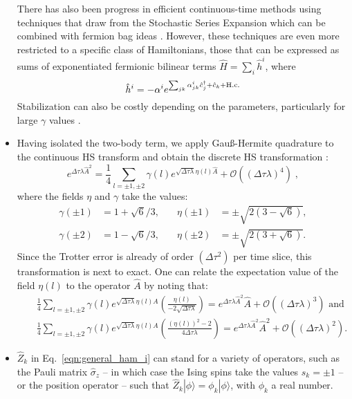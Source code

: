 \begin{itemize}
There has also been progress in efficient continuous-time methods using techniques that draw from the Stochastic Series Expansion \cite{Wang16} which can be combined with fermion bag ideas \cite{Huffman17}. However, these techniques are even more restricted to a specific class of Hamiltonians, those that can be expressed as sums of exponentiated fermionic bilinear terms $\hat{H} = \sum_i \hat{h}^i$, where
\begin{equation}
\hat{h}^i = -\alpha^i e^{\sum_{jk} \alpha^i_{jk} \hat{c}^\dagger_j + \hat{c}_k + \mathrm{H.c.} }
\end{equation}
Stabilization can also be costly depending on the parameters, particularly for large $\gamma$ values \cite{huffman2019}.
\item  Having isolated the two-body term, we apply Gau\ss{}-Hermite quadrature \cite{goth2020} to the 
continuous HS transform and obtain the discrete HS transformation \cite{Motome97,Assaad97}:
\begin{equation}
\label{HS_squares}
        e^{\Delta \tau  \lambda  \hat{A}^2 } = \frac{1}{4}
        \sum_{ l = \pm 1, \pm 2}  \gamma(l)
e^{ \sqrt{\Delta \tau \lambda }
       \eta(l)  \hat{A} }
                + \mathcal{O} \left(  (\Delta \tau \lambda)^4\right) \;,
\end{equation}
where the fields $\eta$ and $\gamma$ take the values:
\begin{equation} \label{eta_gamma_fields}
\begin{aligned}
\gamma(\pm 1) &= 1 + \sqrt{6}/3, \quad & \eta(\pm 1 ) &= \pm \sqrt{2 \left(3 - \sqrt{6} \right)},\\
\gamma(\pm 2) &= 1 - \sqrt{6}/3, \quad & \eta(\pm 2 ) &= \pm \sqrt{2 \left(3 + \sqrt{6} \right)}.
\end{aligned}
\end{equation}
Since the Trotter error is already of order $(\Delta \tau ^2) $ per time slice, this transformation is next to exact.
One can relate the expectation value of the field $\eta(l)$ to the operator $\hat{A}$  by noting that:
\begin{eqnarray} 
    & &  \frac{1}{4} \sum_{l = \pm 1, \pm 2} \gamma(l) e^{\sqrt{ \Delta \tau \lambda} \eta(l) \hat{A}} \left( \frac{\eta(l)}{-2 \sqrt{ \Delta \tau \lambda}  } \right)    =   e^{ \Delta \tau \lambda  \hat{A}^2}  \hat{A}  +   \mathcal{O}  \left( (\Delta \tau \lambda)^3\right)   \text{  and } \nonumber \\  
     & &    \frac{1}{4} \sum_{l = \pm 1, \pm 2} \gamma(l) e^{\sqrt{ \Delta \tau \lambda} \eta(l) \hat{A}} \left( \frac{(\eta(l))^2 - 2}{4 \Delta \tau \lambda  } \right)    =   e^{ \Delta \tau \lambda  \hat{A}^2}  \hat{A}^2  +   \mathcal{O}  \left( (\Delta \tau \lambda)^2\right).
\end{eqnarray}
\item $\hat{Z}_k$ in Eq.~\eqref{eqn:general_ham_i} can stand for a variety of operators, such as the Pauli matrix $\hat{\sigma}_{z}$ -- in which case the Ising spins take the values $s_{k} = \pm 1$ -- or the position operator -- such that $ \hat{Z}_k | \phi\rangle = \phi_k  |\phi\rangle $, with $\phi_k$ a real number.  


\end{itemize}

